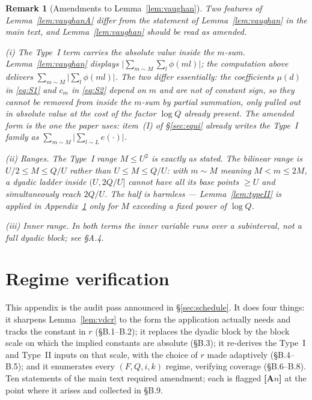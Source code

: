 \documentclass[11pt]{article}
\newtheorem{remark}[theorem]{Remark}
\theoremstyle{definition}
\theoremstyle{plain}
\begin{document}
\begin{remark}[Amendments to Lemma~\ref{lem:vaughan}]\label{rem:vaughanamend}
Two features of Lemma~\ref{lem:vaughanA} differ from the statement of
Lemma~\ref{lem:vaughan} in the main text, and
Lemma~\ref{lem:vaughan} should be read as amended.

\emph{(i) The Type~I term carries the absolute value inside the
$m$-sum.}  Lemma~\ref{lem:vaughan} displays
$\bigl|\sum_{m\sim M}\sum_{l}\phi(ml)\bigr|$; the computation above
delivers $\sum_{m\sim M}\bigl|\sum_{l}\phi(ml)\bigr|$.  The two differ
essentially: the coefficients $\mu(d)$ in \eqref{eq:S1} and $c_{m}$ in
\eqref{eq:S2} depend on $m$ and are not of constant sign, so they cannot
be removed from inside the $m$-sum by partial summation, only pulled out
in absolute value at the cost of the factor $\log Q$ already present.
The amended form is the one the paper uses: item~(I) of
\S\ref{sec:equi} already writes the Type~I family as
$\sum_{m\sim M}\bigl|\sum_{l\sim L}e(\cdot)\bigr|$.

\emph{(ii) Ranges.}  The Type~I range $M\le U^{2}$ is exactly as stated.
The bilinear range is $U/2\le M\le Q/U$ rather than $U\le M\le Q/U$: with
$m\sim M$ meaning $M<m\le2M$, a dyadic ladder inside $(U,2Q/U]$ cannot
have all its base points $\ge U$ and simultaneously reach $2Q/U$.  The
half is harmless --- Lemma~\ref{lem:typeII} is applied in
Appendix~\ref{app:regimes} only for $M$ exceeding a fixed power of
$\log Q$.

\emph{(iii) Inner range.}  In both terms the inner variable runs over a
subinterval, not a full dyadic block; see \S A.4.
\end{remark}

\section{Regime verification}\label{app:regimes}

This appendix is the audit pass announced in \S\ref{sec:schedule}.  It
does four things: it sharpens Lemma~\ref{lem:vdcr} to the form the
application actually needs and tracks the constant in $r$ (\S B.1--B.2);
it replaces the dyadic block by the block scale on which the
implied constants are absolute (\S B.3); it re-derives the Type~I and
Type~II inputs on that scale, with the choice of $r$ made adaptively
(\S B.4--B.5); and it enumerates every $(F,Q,i,k)$ regime, verifying
coverage (\S B.6--B.8).  Ten statements of the main text required
amendment; each is flagged \textbf{[A$n$]} at the point where it arises
and collected in \S B.9.
\end{document}
